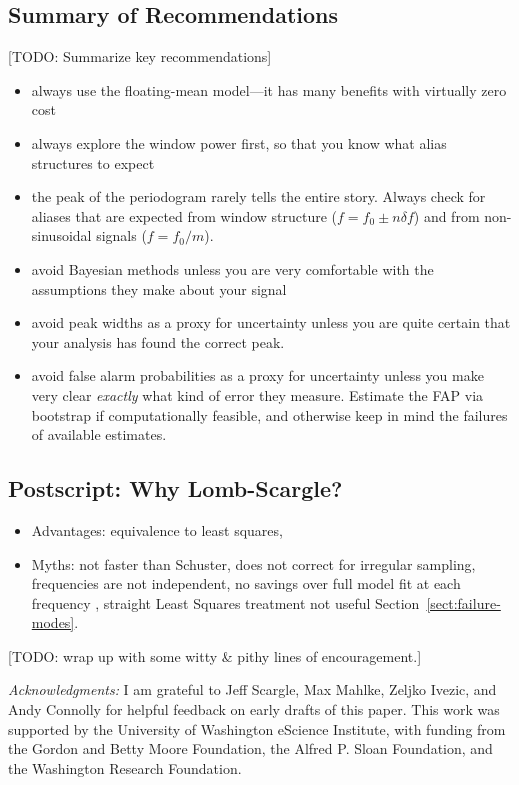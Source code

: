 \documentclass[preprint]{aastex}
\newcommand{\todo}[1]{{\color{red} [TODO: #1]}}
\newcommand{\Sect}[1]{Section~\ref{sect:#1}}
\newcommand{\sect}[1]{\Sect{#1}}
\begin{document}
\subsection{Summary of Recommendations}

\todo{Summarize key recommendations}

\begin{itemize}
\item always use the floating-mean model---it has many benefits with virtually zero cost
\item always explore the window power first, so that you know what alias structures to expect
\item the peak of the periodogram rarely tells the entire story. Always check
  for aliases that are expected from window structure ($f = f_0 \pm n\delta f$)
  and from non-sinusoidal signals ($f = f_0 / m$).
\item avoid Bayesian methods unless you are very comfortable with the
  assumptions they make about your signal
\item avoid peak widths as a proxy for uncertainty unless you are quite
  certain that your analysis has found the correct peak.
\item avoid false alarm probabilities as a proxy for uncertainty
  unless you make very clear {\it exactly} what kind of error they measure.
  Estimate the FAP via bootstrap if computationally feasible, and otherwise
  keep in mind the failures of available estimates.
\end{itemize}

\subsection{Postscript: Why Lomb-Scargle?}

\begin{itemize}
  \item Advantages: equivalence to least squares, 
  \item Myths: not faster than Schuster, does not correct for irregular sampling, frequencies are not independent, no savings over full model fit at each frequency \citep{ICVG2014}, straight Least Squares treatment not useful \sect{failure-modes}.
\end{itemize}

\todo{wrap up with some witty \& pithy lines of encouragement.}

{\it Acknowledgments:} I am grateful to Jeff Scargle, Max Mahlke,
Zeljko Ivezic, and Andy Connolly for helpful feedback on early drafts
of this paper.
This work was supported by the University of Washington eScience Institute,
with funding from the Gordon and Betty Moore Foundation, the Alfred P. Sloan
Foundation, and the Washington Research Foundation.




\end{document}
